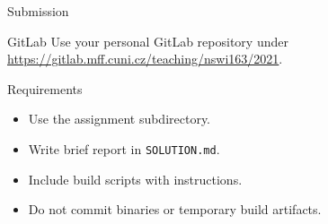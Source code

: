 \begin{frame}{Submission}
    \begin{block}{GitLab}
        Use your personal GitLab repository under \\
        \url{https://gitlab.mff.cuni.cz/teaching/nswi163/2021}.
    \end{block}
    \begin{block}{Requirements}
        \begin{itemize}
            \item Use the assignment subdirectory.
            \item Write brief report in \lstinline{SOLUTION.md}.
            \item Include build scripts with instructions.
            \item Do not commit binaries or temporary build artifacts.
        \end{itemize}
    \end{block}
\end{frame}



